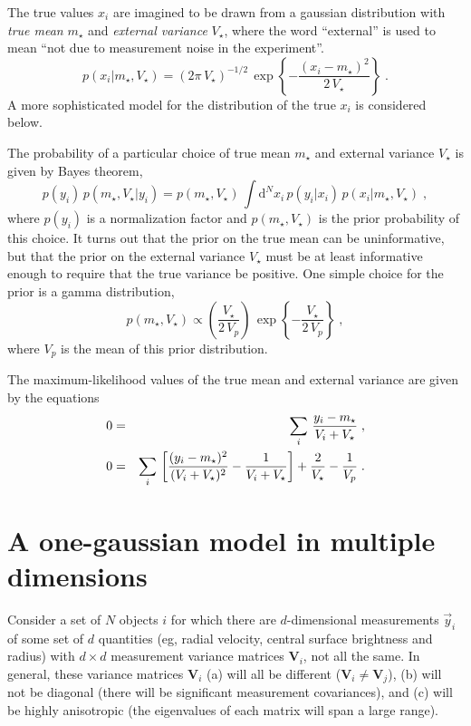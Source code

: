 \documentclass{article}
\begin{document}
The true values $x_i$ are imagined to be drawn from a gaussian
distribution with \emph{true mean} $m_\star$ and \emph{external
variance} $V_\star$, where the word ``external'' is used to mean ``not
due to measurement noise in the experiment''.
\begin{equation}
p(x_i|m_\star,V_\star)=\left(2\pi\,V_\star\right)^{-1/2}\,\exp\left\{-\frac{(x_i-m_\star)^2}{2\,V_\star}\right\}\;.
\end{equation}
A more sophisticated model for the distribution of the true $x_i$ is
considered below.

The probability of a particular choice of true mean $m_\star$ and
external variance $V_\star$ is given by Bayes theorem,
\begin{equation}
p(y_i)\,p(m_\star,V_\star|y_i)=p(m_\star,V_\star)\,\int\mathrm{d}^N\!x_i\,p(y_i|x_i)\,p(x_i|m_\star,V_\star)\;,
\end{equation}
where $p(y_i)$ is a normalization factor and $p(m_\star,V_\star)$ is
the prior probability of this choice.  It turns out that the prior on
the true mean can be uninformative, but that the prior on the external
variance $V_\star$ must be at least informative enough to require that
the true variance be positive.  One simple choice for the prior is a
gamma distribution,
\begin{equation}
p(m_\star,V_\star)\propto\left(\frac{V_\star}{2\,V_p}\right)\,\exp\left\{-\frac{V_\star}{2\,V_p}\right\}\;,
\end{equation}
where $V_p$ is the mean of this prior distribution.

The maximum-likelihood values of the true mean and external variance
are given by the equations
\begin{eqnarray}\displaystyle
0&=&\sum_i\,\frac{y_i-m_\star}{V_i+V_\star}\;,\cr
0&=&\sum_i\,\left[\frac{(y_i-m_\star)^2}{(V_i+V_\star)^2}-\frac{1}{V_i+V_\star}\right]+\frac{2}{V_\star}-\frac{1}{V_p}\;.
\end{eqnarray}

\section{A one-gaussian model in multiple dimensions}

Consider a set of $N$ objects $i$ for which there are $d$-dimensional
measurements $\vec{y}_i$ of some set of $d$ quantities (eg, radial
velocity, central surface brightness and radius) with $d\times d$
measurement variance matrices $\mathbf{V}_i$, not all the same.  In
general, these variance matrices $\mathbf{V}_i$ (a) will all be
different ($\mathbf{V}_i\neq\mathbf{V}_j$), (b) will not be diagonal
(there will be significant measurement covariances), and (c) will be
highly anisotropic (the eigenvalues of each matrix will span a large
range).
\end{document}
